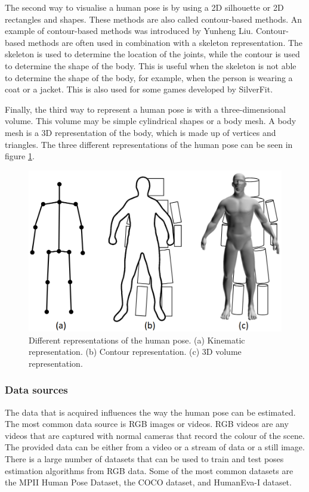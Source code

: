 The second way to visualise a human pose is by using a 2D silhouette or 2D rectangles and shapes. These methods are also called contour-based methods. An example of contour-based methods was introduced by Yunheng Liu\cite{contourHPE}. Contour-based methods are often used in combination with a skeleton representation. The skeleton is used to determine the location of the joints, while the contour is used to determine the shape of the body. This is useful when the skeleton is not able to determine the shape of the body, for example, when the person is wearing a coat or a jacket. This is also used for some games developed by SilverFit.

Finally, the third way to represent a human pose is with a three-dimensional volume. This volume may be simple cylindrical shapes or a body mesh. A body mesh is a 3D representation of the body, which is made up of vertices and triangles. The three different representations of the human pose can be seen in figure \ref{fig:pose_representation}.

\begin{figure}[ht]
    \centering
    \includegraphics[width=0.8\linewidth]{figures/HPE/PoseRepresentation.png}
    \caption[Different representations of the human pose]{Different representations of the human pose. (a) Kinematic representation. (b) Contour representation. (c) 3D volume representation. \cite{HPESurveyOriginal}}
    \label{fig:pose_representation}
\end{figure}

\subsubsection{Data sources}

The data that is acquired influences the way the human pose can be estimated. The most common data source is RGB images or videos. RGB videos are any videos that are captured with normal cameras that record the colour of the scene. The provided data can be either from a video or a stream of data or a still image. There is a large number of datasets that can be used to train and test poses estimation algorithms from RGB data. Some of the most common datasets are the MPII Human Pose Dataset\cite{MPII}, the COCO dataset\cite{Coco}, and HumanEva-I dataset\cite{HumanEva}.

